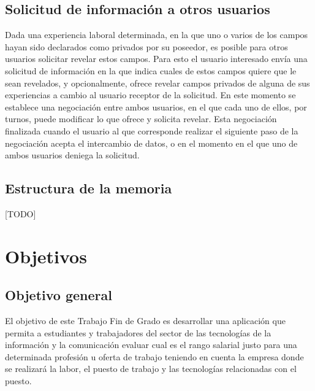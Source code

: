 \documentclass[a4paper, 12pt]{book}
\begin{document}
    \section{Solicitud de información a otros usuarios}
    \label{sec:intro_inforequest}
    Dada una experiencia laboral determinada, en la que uno o varios de los campos hayan sido declarados como privados por su poseedor, es posible para otros usuarios solicitar revelar estos campos.
    Para esto el usuario interesado envía una solicitud de información en la que indica cuales de estos campos quiere que le sean revelados, y opcionalmente, ofrece revelar campos privados de alguna de sus experiencias a cambio al usuario receptor de la solicitud.
    En este momento se establece una negociación entre ambos usuarios, en el que cada uno de ellos, por turnos, puede modificar lo que ofrece y solicita revelar. Esta negociación finalizada cuando el usuario al que corresponde realizar el siguiente paso de la negociación acepta el intercambio de datos, o en el momento en el que uno de ambos usuarios deniega la solicitud.


    \section{Estructura de la memoria}
    \label{sec:intro_memorystructure}
    [TODO]



    \cleardoublepage %


    \chapter{Objetivos} %
    \label{chap:targets} %


    \section{Objetivo general} %
    \label{sec:targets_generaltarget} %

    El objetivo de este Trabajo Fin de Grado es desarrollar una aplicación que permita a estudiantes y trabajadores del sector de las tecnologías de la información y la comunicación evaluar cual es el rango salarial justo para una determinada profesión u oferta de trabajo teniendo en cuenta la empresa donde se realizará la labor, el puesto de trabajo y las tecnologías relacionadas con el puesto.
\end{document}
